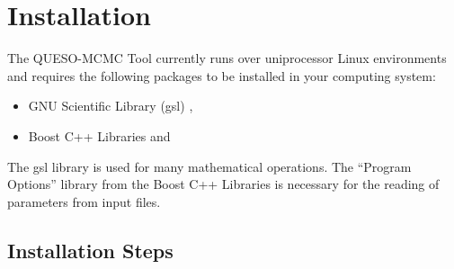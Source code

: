 \chapter{Installation}\label{ch-install}
\thispagestyle{headings}

The QUESO-MCMC Tool currently runs over uniprocessor Linux environments and requires the following packages to be installed in your computing system:
\begin{itemize}
\item GNU Scientific Library (gsl) \cite{gsl},
\item Boost C++ Libraries \cite{boost} and
\end{itemize}
The gsl library is used for many mathematical operations.
The ``Program Options'' library from the Boost C++ Libraries is necessary for the reading of parameters from input files.

\section{Installation Steps}

